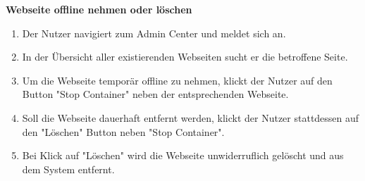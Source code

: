 \textbf{Webseite offline nehmen oder löschen}

\begin{enumerate}
    \item Der Nutzer navigiert zum Admin Center und meldet sich an.
    \item In der Übersicht aller existierenden Webseiten sucht er die betroffene Seite.
    \item Um die Webseite temporär offline zu nehmen, klickt der Nutzer auf den Button "Stop Container" neben der entsprechenden Webseite.
    \item Soll die Webseite dauerhaft entfernt werden, klickt der Nutzer stattdessen auf den "Löschen" Button neben "Stop Container".
    \item Bei Klick auf "Löschen" wird die Webseite unwiderruflich gelöscht und aus dem System entfernt.
\end{enumerate}